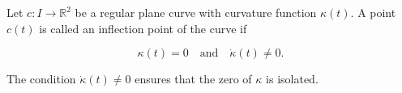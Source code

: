 Let $c: I \to \mathbb{R}^2$ be a regular plane curve with curvature function $\kappa(t)$. A point $c(t)$ is called an inflection point of the curve if

$$\kappa(t) = 0 \quad \text{and} \quad \dot{\kappa}(t) \neq 0.$$

The condition $\dot{\kappa}(t) \neq 0$ ensures that the zero of $\kappa$ is isolated.
